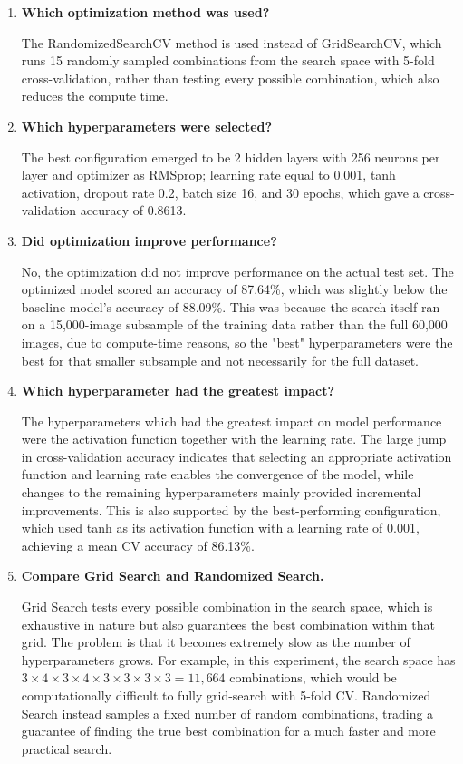 \documentclass[11pt]{article}
\begin{document}
\begin{enumerate}[leftmargin=*]

\item \textbf{Which optimization method was used?}

The RandomizedSearchCV method is used instead of GridSearchCV, which runs 15 randomly sampled combinations from the search space with 5-fold cross-validation, rather than testing every possible combination, which also reduces the compute time.

\item \textbf{Which hyperparameters were selected?}

The best configuration emerged to be 2 hidden layers with 256 neurons per layer and optimizer as RMSprop; learning rate equal to 0.001, tanh activation, dropout rate 0.2, batch size 16, and 30 epochs, which gave a cross-validation accuracy of 0.8613.

\item \textbf{Did optimization improve performance?}

No, the optimization did not improve performance on the actual test set. The optimized model scored an accuracy of 87.64\%, which was slightly below the baseline model's accuracy of 88.09\%. This was because the search itself ran on a 15,000-image subsample of the training data rather than the full 60,000 images, due to compute-time reasons, so the "best" hyperparameters were the best for that smaller subsample and not necessarily for the full dataset.

\item \textbf{Which hyperparameter had the greatest impact?}

The hyperparameters which had the greatest impact on model performance were the activation function together with the learning rate. The large jump in cross-validation accuracy indicates that selecting an appropriate activation function and learning rate enables the convergence of the model, while changes to the remaining hyperparameters mainly provided incremental improvements. This is also supported by the best-performing configuration, which used tanh as its activation function with a learning rate of 0.001, achieving a mean CV accuracy of 86.13\%.

\item \textbf{Compare Grid Search and Randomized Search.}

Grid Search tests every possible combination in the search space, which is exhaustive in nature but also guarantees the best combination within that grid. The problem is that it becomes extremely slow as the number of hyperparameters grows. For example, in this experiment, the search space has $3\times4\times3\times4\times3\times3\times3\times3 = 11{,}664$ combinations, which would be computationally difficult to fully grid-search with 5-fold CV. Randomized Search instead samples a fixed number of random combinations, trading a guarantee of finding the true best combination for a much faster and more practical search.


\end{enumerate}
\end{document}
